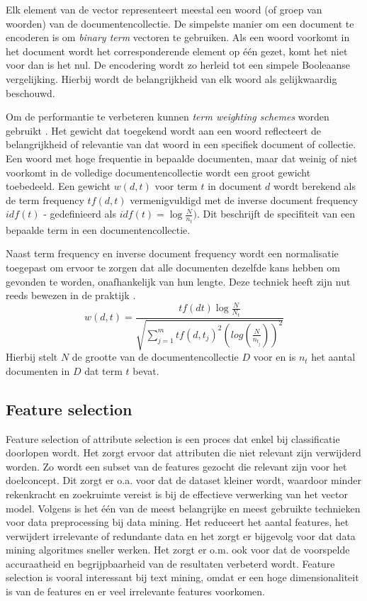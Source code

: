 Elk element van de vector representeert meestal een woord (of groep van woorden) van de documentencollectie. De simpelste manier om een document te encoderen is om \textit{binary term} vectoren te gebruiken. Als een woord voorkomt in het document wordt het corresponderende element op \'e\'en gezet, komt het niet voor dan is het nul. De encodering wordt zo herleid tot een simpele Booleaanse vergelijking. Hierbij wordt de belangrijkheid van elk woord als gelijkwaardig beschouwd. 

Om de performantie te verbeteren kunnen \textit{term weighting schemes} worden gebruikt \cite{Salton1988}. Het gewicht dat toegekend wordt aan een woord reflecteert de belangrijkheid of relevantie van dat woord in een specifiek document of collectie. Een woord met hoge frequentie in bepaalde documenten, maar dat weinig of niet voorkomt in de volledige documentencollectie wordt een groot gewicht toebedeeld. Een gewicht $w(d,t)$ voor term $t$ in document $d$ wordt berekend als de term frequency $tf(d,t)$ vermenigvuldigd met de inverse document frequency $idf(t)$ - gedefinieerd als $idf(t)=\log{\frac{N}{n_t}})$. Dit beschrijft de specifiteit van een bepaalde term in een documentencollectie. 

Naast term frequency en inverse document frequency wordt een normalisatie toegepast om ervoor te zorgen dat alle documenten dezelfde kans hebben om gevonden te worden, onafhankelijk van hun lengte. Deze techniek heeft zijn nut reeds bewezen in de praktijk . 
\begin{equation}\label{eq:tfidf}
w(d,t) = \frac{tf(dt)\log{\frac{N}{N_t}}}{\sqrt{\sum_{j=1}^{m}tf(d,t_j)^2(log(\frac{N}{n_{t_j}}))^2}}
\end{equation}
Hierbij stelt $N$ de grootte van de documentencollectie $D$ voor en is $n_t$ het aantal documenten in $D$ dat term $t$ bevat.

\subsection{Feature selection}\label{feature-selection}
Feature selection of attribute selection is een proces dat enkel bij classificatie doorlopen wordt. Het zorgt ervoor dat attributen die niet relevant zijn verwijderd worden. Zo wordt een subset van de features gezocht die relevant zijn voor het doelconcept. Dit zorgt er o.a. voor dat de dataset kleiner wordt, waardoor minder rekenkracht en zoekruimte vereist is bij de effectieve verwerking van het vector model. Volgens \cite{Liu2005} is het \'e\'en van de meest belangrijke en meest gebruikte technieken voor data preprocessing bij data mining. Het reduceert het aantal features, het verwijdert irrelevante of redundante data en het zorgt er bijgevolg voor dat data mining algoritmes sneller werken. Het zorgt er o.m. ook voor dat de voorspelde accuraatheid en begrijpbaarheid van de resultaten verbeterd wordt. Feature selection is vooral interessant bij text mining, omdat er een hoge dimensionaliteit is van de features en er veel irrelevante features voorkomen.


